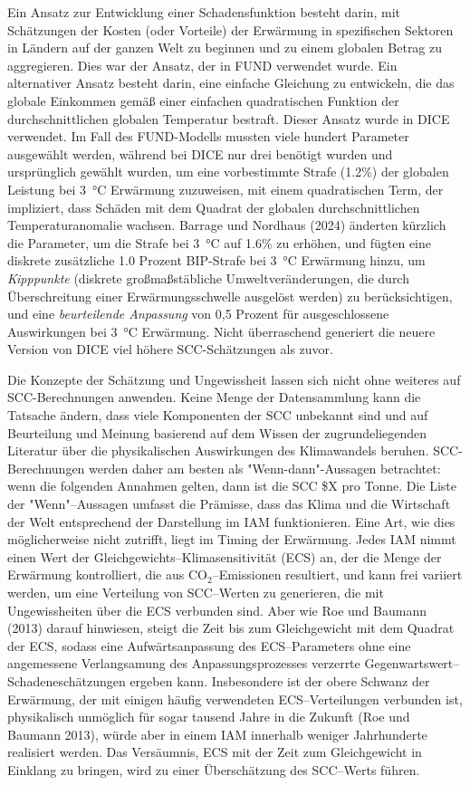 \documentclass[12pt,paper=a4,DIV=12,parskip=never,chapterprefix=false,headings=standardclasses]{scrreprt}
\begin{document}
Ein Ansatz zur Entwicklung einer Schadensfunktion besteht darin, mit Schätzungen der Kosten (oder Vorteile) der Erwärmung in spezifischen Sektoren in Ländern auf der ganzen Welt zu beginnen und zu einem globalen Betrag zu aggregieren. Dies war der Ansatz, der in FUND verwendet wurde. Ein alternativer Ansatz besteht darin, eine einfache Gleichung zu entwickeln, die das globale Einkommen gemäß einer einfachen quadratischen Funktion der durchschnittlichen globalen Temperatur bestraft. Dieser Ansatz wurde in DICE verwendet. Im Fall des FUND-Modells mussten viele hundert Parameter ausgewählt werden, während bei DICE nur drei benötigt wurden und ursprünglich gewählt wurden, um eine vorbestimmte Strafe (1.2\%) der globalen Leistung bei \SI{3}{\celsius} Erwärmung zuzuweisen, mit einem quadratischen Term, der impliziert, dass Schäden mit dem Quadrat der globalen durchschnittlichen Temperaturanomalie wachsen. Barrage und Nordhaus (2024) änderten kürzlich die Parameter, um die Strafe bei \SI{3}{\celsius} auf 1.6\% zu erhöhen, und fügten eine diskrete zusätzliche 1.0 Prozent BIP-Strafe bei \SI{3}{\celsius} Erwärmung hinzu, um \emph{Kipppunkte} (diskrete großmaßstäbliche Umweltveränderungen, die durch Überschreitung einer Erwärmungsschwelle ausgelöst werden) zu berücksichtigen, und eine \emph{beurteilende Anpassung} von 0,5 Prozent für ausgeschlossene Auswirkungen bei \SI{3}{\celsius} Erwärmung. Nicht überraschend generiert die neuere Version von DICE viel höhere SCC-Schätzungen als zuvor.

Die Konzepte der Schätzung und Ungewissheit lassen sich nicht ohne weiteres auf SCC-Berechnungen anwenden. Keine Menge der Datensammlung kann die Tatsache ändern, dass viele Komponenten der SCC unbekannt sind und auf Beurteilung und Meinung basierend auf dem Wissen der zugrundeliegenden Literatur über die physikalischen Auswirkungen des Klimawandels beruhen. SCC-Berechnungen werden daher am besten als "Wenn-dann"-Aussagen betrachtet: wenn die folgenden Annahmen gelten, dann ist die SCC \$X pro Tonne. Die Liste der "Wenn"--Aussagen umfasst die Prämisse, dass das Klima und die Wirtschaft der Welt entsprechend der Darstellung im IAM funktionieren. Eine Art, wie dies möglicherweise nicht zutrifft, liegt im Timing der Erwärmung. Jedes IAM nimmt einen Wert der Gleichgewichts--Klimasensitivität (ECS) an, der die Menge der Erwärmung kontrolliert, die aus CO$_2$--Emissionen resultiert, und kann frei variiert werden, um eine Verteilung von SCC--Werten zu generieren, die mit Ungewissheiten über die ECS verbunden sind. Aber wie Roe und Baumann (2013) darauf hinwiesen, steigt die Zeit bis zum Gleichgewicht mit dem Quadrat der ECS, sodass eine Aufwärtsanpassung des ECS--Parameters ohne eine angemessene Verlangsamung des Anpassungsprozesses verzerrte Gegenwartswert--Schadeneschätzungen ergeben kann. Insbesondere ist der obere Schwanz der Erwärmung, der mit einigen häufig verwendeten ECS--Verteilungen verbunden ist, physikalisch unmöglich für sogar tausend Jahre in die Zukunft (Roe und Baumann 2013), würde aber in einem IAM innerhalb weniger Jahrhunderte realisiert werden. Das Versäumnis, ECS mit der Zeit zum Gleichgewicht in Einklang zu bringen, wird zu einer Überschätzung des SCC--Werts führen.
\end{document}
